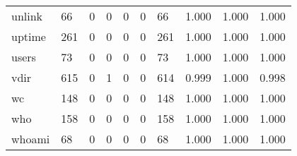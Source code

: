 \begin{longtable}{lp{2.0cm}p{2.0cm}p{2.0cm}p{2.0cm}p{2.0cm}p{2.0cm}p{2.0cm}p{2.0cm}p{2.0cm}}
unlink    &                     66 &                                             0 &                                            0 &                                           0 &                                            0 &                                         66 &                                1.000 &                                  1.000 &                                1.000 \\
uptime    &                    261 &                                             0 &                                            0 &                                           0 &                                            0 &                                        261 &                                1.000 &                                  1.000 &                                1.000 \\
users     &                     73 &                                             0 &                                            0 &                                           0 &                                            0 &                                         73 &                                1.000 &                                  1.000 &                                1.000 \\
vdir      &                    615 &                                             0 &                                            1 &                                           0 &                                            0 &                                        614 &                                0.999 &                                  1.000 &                                0.998 \\
wc        &                    148 &                                             0 &                                            0 &                                           0 &                                            0 &                                        148 &                                1.000 &                                  1.000 &                                1.000 \\
who       &                    158 &                                             0 &                                            0 &                                           0 &                                            0 &                                        158 &                                1.000 &                                  1.000 &                                1.000 \\
whoami    &                     68 &                                             0 &                                            0 &                                           0 &                                            0 &                                         68 &                                1.000 &                                  1.000 &                                1.000 \\

\end{longtable}
